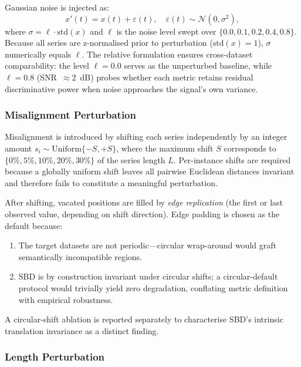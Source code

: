 Gaussian noise is injected as:
\begin{equation}
    x'(t) = x(t) + \varepsilon(t), \quad \varepsilon(t) \sim \mathcal{N}(0, \sigma^2),
\end{equation}
where $\sigma = \ell \cdot \mathrm{std}(x)$ and $\ell$ is the noise level swept over $\{0.0, 0.1, 0.2, 0.4, 0.8\}$.
Because all series are z-normalised prior to perturbation ($\mathrm{std}(x) = 1$), $\sigma$ numerically equals $\ell$.
The relative formulation ensures cross-dataset comparability: the level $\ell = 0.0$ serves as the unperturbed baseline, while $\ell = 0.8$ (SNR~$\approx 2$~dB) probes whether each metric retains residual discriminative power when noise approaches the signal's own variance.

\subsubsection{Misalignment Perturbation}\label{sec:method-shift}

Misalignment is introduced by shifting each series independently by an integer amount $s_i \sim \mathrm{Uniform}\{-S, +S\}$, where the maximum shift $S$ corresponds to $\{0\%, 5\%, 10\%, 20\%, 30\%\}$ of the series length $L$.
Per-instance shifts are required because a globally uniform shift leaves all pairwise Euclidean distances invariant and therefore fails to constitute a meaningful perturbation.

After shifting, vacated positions are filled by \emph{edge replication} (the first or last observed value, depending on shift direction).
Edge padding is chosen as the default because:
\begin{enumerate}
    \item The target datasets are not periodic---circular wrap-around would graft semantically incompatible regions.
    \item SBD is by construction invariant under circular shifts; a circular-default protocol would trivially yield zero degradation, conflating metric definition with empirical robustness.
\end{enumerate}
A circular-shift ablation is reported separately to characterise SBD's intrinsic translation invariance as a distinct finding.

\subsubsection{Length Perturbation}\label{sec:method-length}

